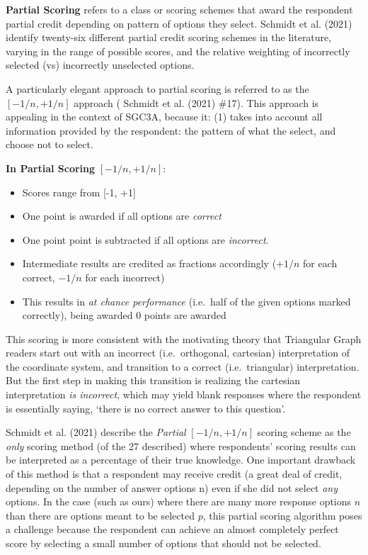 \documentclass[
  letterpaper,
  DIV=11,
  numbers=noendperiod]{scrreprt}
\providecommand{\tightlist}{%
  \setlength{\itemsep}{0pt}\setlength{\parskip}{0pt}}\usepackage{longtable,booktabs,array}
\begin{document}
\textbf{Partial Scoring} refers to a class or scoring schemes that award
the respondent partial credit depending on pattern of options they
select. Schmidt et al. (2021) identify twenty-six different partial
credit scoring schemes in the literature, varying in the range of
possible scores, and the relative weighting of incorrectly selected (vs)
incorrectly unselected options.

A particularly elegant approach to partial scoring is referred to as the
\([-1/n, +1/n]\) approach ( Schmidt et al. (2021) \#17). This approach
is appealing in the context of SGC3A, because it: (1) takes into account
all information provided by the respondent: the pattern of what the
select, and choose not to select.

\textbf{In Partial Scoring} \([-1/n, +1/n]\):

\begin{itemize}
\tightlist
\item
  Scores range from {[}-1, +1{]}
\item
  One point is awarded if all options are \emph{correct}
\item
  One point point is subtracted if all options are \emph{incorrect}.
\item
  Intermediate results are credited as fractions accordingly (\(+1/n\)
  for each correct, \(-1/n\) for each incorrect)
\item
  This results in \emph{at chance performance} (i.e.~half of the given
  options marked correctly), being awarded 0 points are awarded
\end{itemize}

This scoring is more consistent with the motivating theory that
Triangular Graph readers start out with an incorrect (i.e.~orthogonal,
cartesian) interpretation of the coordinate system, and transition to a
correct (i.e.~triangular) interpretation. But the first step in making
this transition is realizing the cartesian interpretation \emph{is
incorrect}, which may yield blank responses where the respondent is
essentially saying, `there is no correct answer to this question'.

Schmidt et al. (2021) describe the \emph{Partial} \({[-1/n, +1/n]}\)
scoring scheme as the \emph{only} scoring method (of the 27 described)
where respondents' scoring results can be interpreted as a percentage of
their true knowledge. One important drawback of this method is that a
respondent may receive credit (a great deal of credit, depending on the
number of answer options n) even if she did not select \emph{any}
options. In the case (such as ours) where there are many more response
options \(n\) than there are options meant to be selected \(p\), this
partial scoring algorithm poses a challenge because the respondent can
achieve an almost completely perfect score by selecting a small number
of options that should not be selected.
\end{document}
